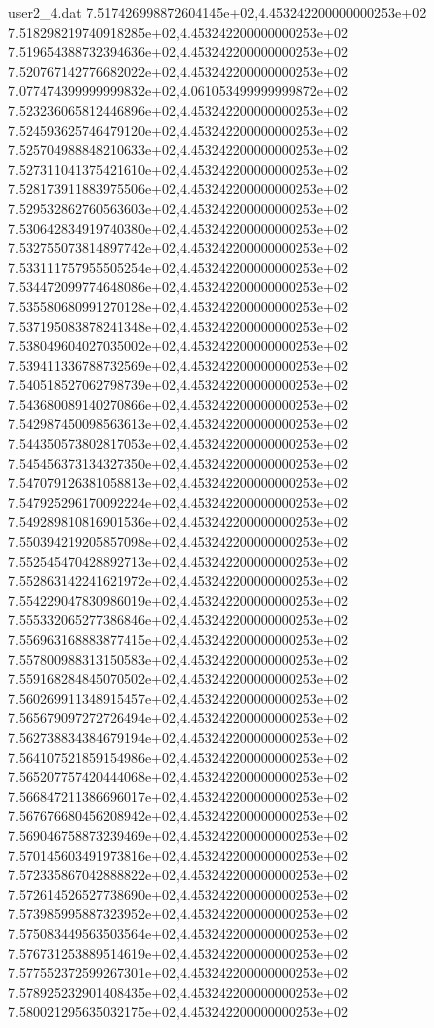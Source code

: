 \begin{filecontents}{user2_4.dat}
7.517426998872604145e+02,4.453242200000000253e+02
7.518298219740918285e+02,4.453242200000000253e+02
7.519654388732394636e+02,4.453242200000000253e+02
7.520767142776682022e+02,4.453242200000000253e+02
7.077474399999999832e+02,4.061053499999999872e+02
7.523236065812446896e+02,4.453242200000000253e+02
7.524593625746479120e+02,4.453242200000000253e+02
7.525704988848210633e+02,4.453242200000000253e+02
7.527311041375421610e+02,4.453242200000000253e+02
7.528173911883975506e+02,4.453242200000000253e+02
7.529532862760563603e+02,4.453242200000000253e+02
7.530642834919740380e+02,4.453242200000000253e+02
7.532755073814897742e+02,4.453242200000000253e+02
7.533111757955505254e+02,4.453242200000000253e+02
7.534472099774648086e+02,4.453242200000000253e+02
7.535580680991270128e+02,4.453242200000000253e+02
7.537195083878241348e+02,4.453242200000000253e+02
7.538049604027035002e+02,4.453242200000000253e+02
7.539411336788732569e+02,4.453242200000000253e+02
7.540518527062798739e+02,4.453242200000000253e+02
7.543680089140270866e+02,4.453242200000000253e+02
7.542987450098563613e+02,4.453242200000000253e+02
7.544350573802817053e+02,4.453242200000000253e+02
7.545456373134327350e+02,4.453242200000000253e+02
7.547079126381058813e+02,4.453242200000000253e+02
7.547925296170092224e+02,4.453242200000000253e+02
7.549289810816901536e+02,4.453242200000000253e+02
7.550394219205857098e+02,4.453242200000000253e+02
7.552545470428892713e+02,4.453242200000000253e+02
7.552863142241621972e+02,4.453242200000000253e+02
7.554229047830986019e+02,4.453242200000000253e+02
7.555332065277386846e+02,4.453242200000000253e+02
7.556963168883877415e+02,4.453242200000000253e+02
7.557800988313150583e+02,4.453242200000000253e+02
7.559168284845070502e+02,4.453242200000000253e+02
7.560269911348915457e+02,4.453242200000000253e+02
7.565679097272726494e+02,4.453242200000000253e+02
7.562738834384679194e+02,4.453242200000000253e+02
7.564107521859154986e+02,4.453242200000000253e+02
7.565207757420444068e+02,4.453242200000000253e+02
7.566847211386696017e+02,4.453242200000000253e+02
7.567676680456208942e+02,4.453242200000000253e+02
7.569046758873239469e+02,4.453242200000000253e+02
7.570145603491973816e+02,4.453242200000000253e+02
7.572335867042888822e+02,4.453242200000000253e+02
7.572614526527738690e+02,4.453242200000000253e+02
7.573985995887323952e+02,4.453242200000000253e+02
7.575083449563503564e+02,4.453242200000000253e+02
7.576731253889514619e+02,4.453242200000000253e+02
7.577552372599267301e+02,4.453242200000000253e+02
7.578925232901408435e+02,4.453242200000000253e+02
7.580021295635032175e+02,4.453242200000000253e+02

\end{filecontents}
